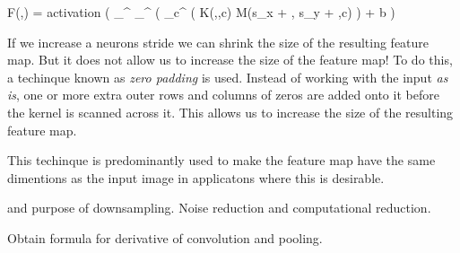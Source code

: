 \startplaceformula[reference=devel-feature-5]
\startformula
F(\color[red]{x},\color[red]{y})
=
{\rm activation}
\left( 
\sum_{\color[blue]{y}}^{}
\sum_{\color[blue]{x}}^{}
\left(
\sum_{c}^{}
\Bigl(
K(\color[blue]{x},\color[blue]{y},c)
\cdot
M(\color[red]{x}s_x + \color[blue]{x}, \color[red]{y}s_y + \color[blue]{y},c)
\right)
+
b
\right)
\stopformula
\stopplaceformula
\stopsubsubsection

\startsubsubsection[title=Zero padding]
If we increase a neurons stride we can shrink the size of the resulting feature map.
But it does not allow us to increase the size of the feature map!
To do this, a techinque known as {\em zero padding} is used.
Instead of working with the input {\em as is}, one or more extra outer rows and columns of zeros are added onto it before the kernel is scanned across it.
This allows us to increase the size of the resulting feature map.

This techinque is predominantly used to make the feature map have the same dimentions as the input image in applicatons where this is desirable.
\stopsubsubsection



 and purpose of downsampling.
Noise reduction and computational reduction.
\stopsubsection

\startsubsection[title=Backward Propagation]
Obtain formula for derivative of convolution and pooling.
\stopsubsection
\stopsection